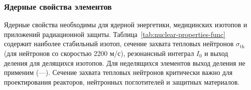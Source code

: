 \documentclass[12pt,a4paper]{article}
\begin{document}
	\subsubsection{Ядерные свойства элементов}
	\label{subsec:nuclear-properties-func}
	
	Ядерные свойства необходимы для ядерной энергетики, медицинских изотопов и приложений радиационной защиты. Таблица~\ref{tab:nuclear-properties-func} содержит наиболее стабильный изотоп, сечение захвата тепловых нейтронов \(\sigma_{\text{th}}\) (для нейтронов со скоростью 2200 м/с), резонансный интеграл \(I_0\) и выход деления для делящихся изотопов. Для неделящихся элементов выход деления не применим (---). Сечение захвата тепловых нейтронов критически важно для проектирования реакторов, нейтронных поглотителей и защитных материалов.
	
\end{document}
